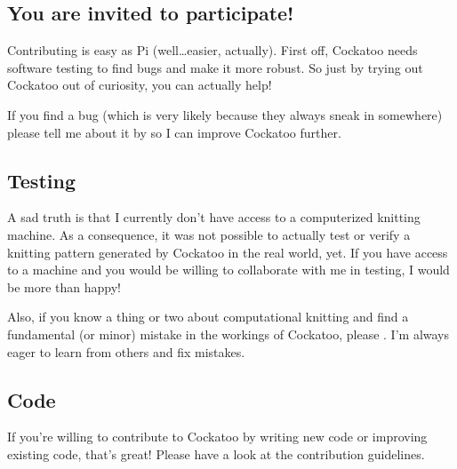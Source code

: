 \documentclass[letterpaper,10pt,english]{sphinxmanual}
\begin{document}
\subsection{You are invited to participate!}
\label{\detokenize{README:you-are-invited-to-participate}}
Contributing is easy as Pi (well…easier, actually). First off,
Cockatoo needs software testing to find bugs and make it more robust. So
just by trying out Cockatoo out of curiosity, you can actually help!

If you find a bug (which is very likely because they always sneak in
somewhere) please tell me about it by  so I can improve
Cockatoo further.


\subsection{Testing}
\label{\detokenize{README:testing}}
A sad truth is that I currently don’t have access to a computerized
knitting machine. As a consequence, it was not possible to actually test
or verify a knitting pattern generated by Cockatoo in the real world,
yet. If you have access to a machine and you would be willing to
collaborate with me in testing, I would be more than happy!

Also, if you know a thing or two about computational knitting and find a
fundamental (or minor) mistake in the workings of Cockatoo, please . I’m always eager
to learn from others and fix mistakes.


\subsection{Code}
\label{\detokenize{README:code}}
If you’re willing to contribute to Cockatoo by writing new code or
improving existing code, that’s great! Please have a look at the
contribution guidelines.
\end{document}
